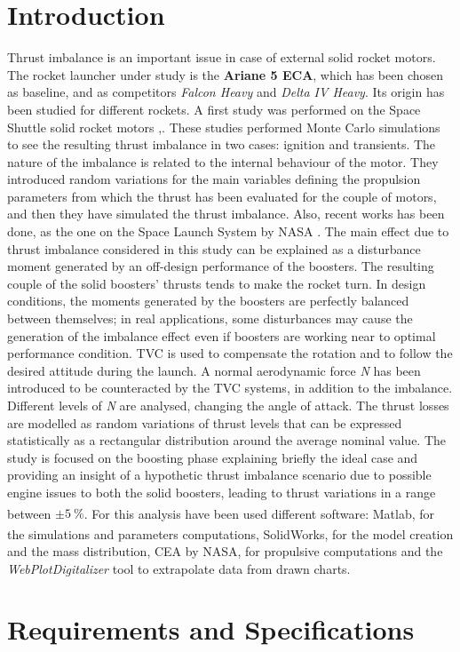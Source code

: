 \documentclass[12pt,fleqn,openany]{book} %
\begin{document}
\chapter{Introduction}
Thrust imbalance is an important issue in case of external solid rocket motors. The rocket launcher under study is the \textbf{Ariane 5 ECA}, which has been chosen as baseline, and as competitors \textit{Falcon Heavy} and \textit{Delta IV Heavy}. Its origin has been studied for different rockets. A first study was performed on the Space Shuttle solid rocket motors \cite{bib:1},\cite{bib:2}. These studies performed Monte Carlo simulations to see the resulting thrust imbalance in two cases: ignition and transients. The nature of the imbalance is related to the internal behaviour of the motor. They introduced random variations for the main variables defining the propulsion parameters from which the thrust has been evaluated for the couple of motors, and then they have simulated the thrust imbalance. Also, recent works has been done, as the one on the Space Launch System by NASA \cite{bib:3}. The main effect due to thrust imbalance considered in this study can be explained as a disturbance moment generated by an off-design performance of the boosters. The resulting couple of the solid boosters’ thrusts tends to make the rocket turn. In design conditions, the moments generated by the boosters are perfectly balanced between themselves; in real applications, some disturbances may cause the generation of the imbalance effect even if boosters are working near to optimal performance condition. TVC is used to compensate the rotation and to follow the desired attitude during the launch. A normal aerodynamic force \textit{N} has been introduced to be counteracted by the TVC systems, in addition to the imbalance. Different levels of \textit{N} are analysed, changing the angle of attack. The thrust losses are modelled as random variations of thrust levels that can be expressed statistically as a rectangular distribution around the average nominal value. The study is focused on the boosting phase explaining briefly the ideal case and providing an insight of a hypothetic thrust imbalance scenario due to possible engine issues to both the solid boosters, leading to thrust variations in a range between $\pm\SI{5}{\%}$. For this analysis have been used different software: Matlab\textsuperscript\textregistered, for the simulations and parameters computations, SolidWorks\textsuperscript\textregistered, for the model creation and the mass distribution, CEA by NASA, for propulsive computations and the \textit{WebPlotDigitalizer} tool to extrapolate data from drawn charts.\chapter{Requirements and Specifications}
\end{document}
